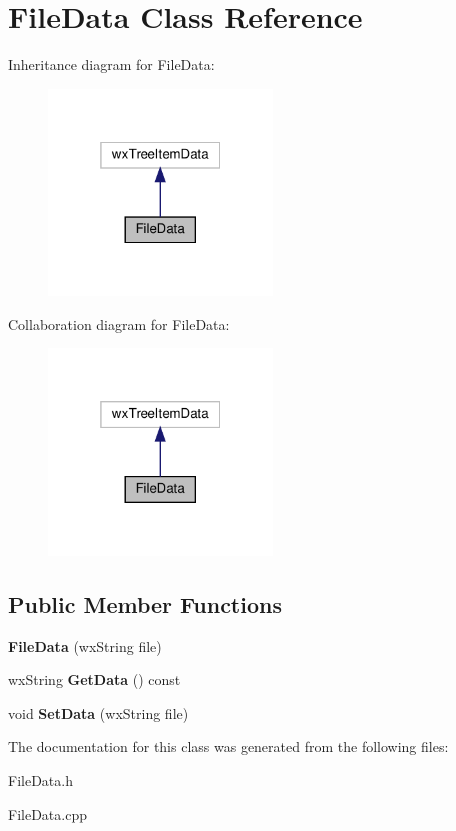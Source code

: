 \hypertarget{class_file_data}{}\section{File\+Data Class Reference}
\label{class_file_data}


Inheritance diagram for File\+Data\+:
\nopagebreak
\begin{figure}[H]
\begin{center}
\leavevmode
\includegraphics[width=169pt]{class_file_data__inherit__graph}
\end{center}
\end{figure}


Collaboration diagram for File\+Data\+:
\nopagebreak
\begin{figure}[H]
\begin{center}
\leavevmode
\includegraphics[width=169pt]{class_file_data__coll__graph}
\end{center}
\end{figure}
\subsection*{Public Member Functions}
\begin{DoxyCompactItemize}
\item 
\mbox{\label{class_file_data_a9e3b53ecc46a3ad970445e7a30124b7d}} 
{\bfseries File\+Data} (wx\+String file)
\item 
\mbox{\label{class_file_data_a5e0c34cb0c81a06cca07548ca63ffa27}} 
wx\+String {\bfseries Get\+Data} () const
\item 
\mbox{\label{class_file_data_ad641777d21f2cf2a90df48f1e0f546c5}} 
void {\bfseries Set\+Data} (wx\+String file)
\end{DoxyCompactItemize}


The documentation for this class was generated from the following files\+:\begin{DoxyCompactItemize}
\item 
File\+Data.\+h\item 
File\+Data.\+cpp\end{DoxyCompactItemize}
